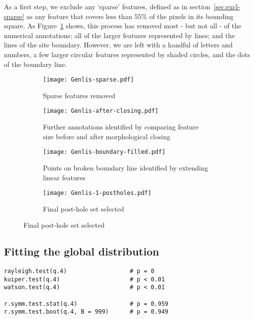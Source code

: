\documentclass[../../ArchStats.tex]{subfiles}
\begin{document}
As a first step, we exclude any `sparse' features, defined as in section~\ref{sec:excl-sparse} as any feature that covers less than 55\% of the pixels in its bounding square. As Figure~\ref{fig:Genlis-f-ext-sparse-removed} shows, this process has removed most - but not all - of the numerical annotations; all of the larger features represented by lines; and the lines of the site boundary. However, we are left with a handful of letters and numbers, a few larger circular features represented by shaded circles, and the dots of the boundary line.

\begin{figure}[h!]
\label{fig:Genlis-f-ext}
\centering
\caption{Stages of post-hole feature identification process for the Genlis site plan. }
%
\begin{subfigure}[b]{0.46\textwidth}
\caption{Sparse features removed}
\label{fig:Genlis-f-ext-sparse-removed}
\centering
\texttt{[image: Genlis-sparse.pdf]}
\end{subfigure}
%
\begin{subfigure}[b]{0.46\textwidth}
\caption{Further annotations identified by comparing feature size before and after morphological closing}
\centering
\texttt{[image: Genlis-after-closing.pdf]}
\end{subfigure}

\vspace{10pt}
%
\begin{subfigure}[b]{0.46\textwidth}
\caption{Points on broken boundary line identified by extending linear features}
\centering
\texttt{[image: Genlis-boundary-filled.pdf]}
\end{subfigure}
%
\begin{subfigure}[b]{0.46\textwidth}
\caption{Final post-hole set selected}
\centering
\texttt{[image: Genlis-1-postholes.pdf]}
\end{subfigure}
%
\end{figure}






\subsection{Fitting the global distribution}

\begin{verbatim}
rayleigh.test(q.4)                  # p = 0
kuiper.test(q.4)                    # p < 0.01
watson.test(q.4)                    # p < 0.01

r.symm.test.stat(q.4)               # p = 0.959
r.symm.test.boot(q.4, B = 999)      # p = 0.949
\end{verbatim}
\end{document}
